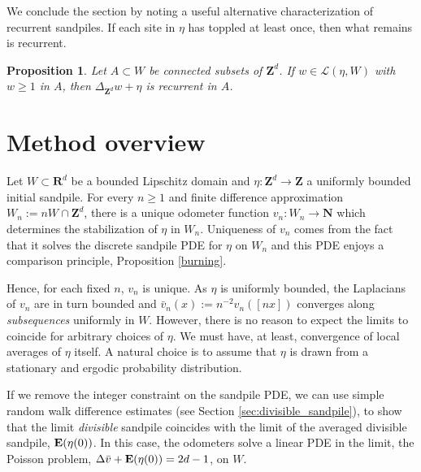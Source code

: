 \documentclass[12pt]{amsart}
\newcommand{\R}{\mathbf{R}}
\newcommand{\Z}{\mathbf{Z}}
\newcommand{\N}{\mathbf{N}}
\newcommand{\E}{\mathop{\bf E{}}}
\newtheorem{prop}{Proposition}[section]
\begin{document}
We conclude the section by noting a useful alternative characterization of recurrent sandpiles.  If each site in $\eta$
has toppled at least once, then what remains is recurrent. 
\begin{prop}\label{recurrent}
Let $A \subset W$ be connected subsets of $\Z^d$.  If $w \in \mathcal{L}(\eta, W)$ with $w \geq 1$ in $A$, then $\Delta_{\Z^d} w+ \eta$ is recurrent in $A$. 
\end{prop}

\section{Method overview} \label{sec:overview}
Let $W \subset \R^d$ be a bounded Lipschitz domain and $\eta :\Z^d \to \Z$ a uniformly bounded initial sandpile. 
For every $n \geq 1$ and finite difference approximation $W_n := n W \cap \Z^d$, there is a unique odometer function $v_n : W_n \to \N$ which determines the stabilization of $\eta$ in $W_n$. Uniqueness of $v_n$ comes from the fact that it solves the discrete sandpile PDE for $\eta$ on $W_n$ and this PDE enjoys a comparison principle, Proposition \ref{burning}. 

Hence, for each fixed $n$, $v_n$ is unique. As $\eta$ is uniformly bounded, the Laplacians of $v_n$
are in turn bounded and $\bar{v}_n(x):= n^{-2} v_n([n x])$ converges along {\it subsequences} uniformly in $W$. However, there is no reason to expect the limits to coincide for arbitrary choices of $\eta$. We must have, at least, 
convergence of local averages of $\eta$ itself. A natural choice is to assume that $\eta$ is drawn from a stationary and ergodic probability distribution. 

If we remove the integer constraint on the sandpile PDE, we can use simple random walk 
difference estimates (see Section \ref{sec:divisible_sandpile}), to show that the limit {\it divisible} sandpile
coincides with the limit of the averaged divisible sandpile, $\E(\eta(0))$. In this case, the odometers 
solve a linear PDE in the limit, the Poisson problem, $\Delta \bar{v} + \E(\eta(0)) = 2 d -1$, on $W$. 
\end{document}
